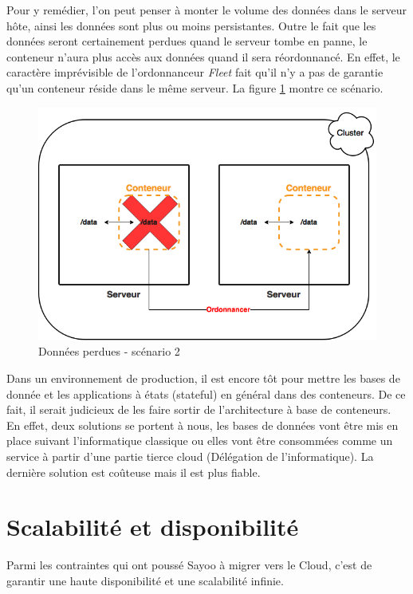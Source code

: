 \begin{onehalfspace}
Pour y remédier, l'on peut penser à monter le volume des données dans le serveur hôte, ainsi les données sont plus ou moins persistantes. Outre le fait que les données seront certainement perdues quand le serveur tombe en panne, le conteneur n'aura plus accès aux données quand il sera réordonnancé. En effet, le caractère imprévisible de l'ordonnanceur \emph{Fleet} fait qu'il n'y a pas de garantie qu'un conteneur réside dans le même serveur. La figure \ref{fig:database2} montre ce scénario.

\begin{figure}[H]
\centering
\includegraphics [scale=0.5]{chapitre4/assets/database2}
\caption{Données perdues - scénario 2}
\label{fig:database2}
\end{figure}


Dans un environnement de production, il est encore tôt pour mettre les bases de donnée et les applications à états (stateful) en général dans des conteneurs. De ce fait, il serait judicieux de les faire sortir de l'architecture à base de conteneurs. En effet, deux solutions se portent à nous, les bases de données vont être mis en place suivant l'informatique classique ou elles vont être consommées comme un service à partir d'une partie tierce cloud (Délégation de l'informatique). La dernière solution est coûteuse mais il est plus fiable.



\section{Scalabilité et disponibilité}


Parmi les contraintes qui ont poussé Sayoo à migrer vers le Cloud, c'est de garantir une haute disponibilité et une scalabilité infinie.


\end{onehalfspace}
